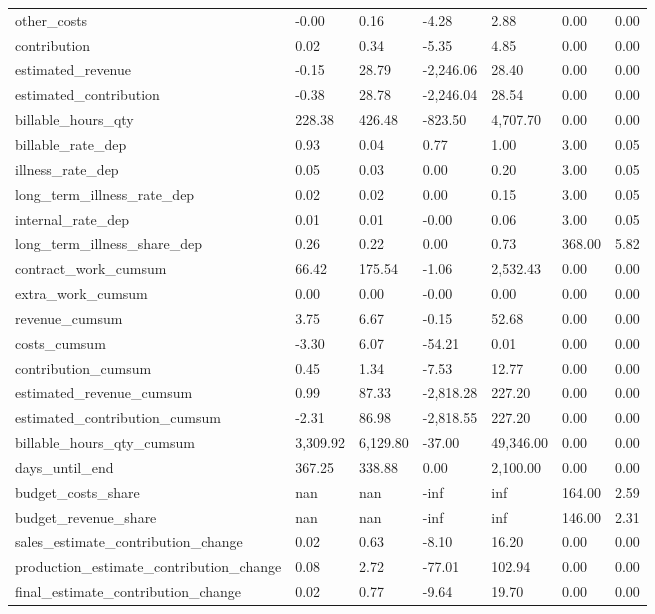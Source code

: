 \begin{landscape}
\begin{longtable}[h!]{lllllll}
other_costs & -0.00 & 0.16 & -4.28 & 2.88 & 0.00 & 0.00 \\
contribution & 0.02 & 0.34 & -5.35 & 4.85 & 0.00 & 0.00 \\
estimated_revenue & -0.15 & 28.79 & -2,246.06 & 28.40 & 0.00 & 0.00 \\
estimated_contribution & -0.38 & 28.78 & -2,246.04 & 28.54 & 0.00 & 0.00 \\
billable_hours_qty & 228.38 & 426.48 & -823.50 & 4,707.70 & 0.00 & 0.00 \\
billable_rate_dep & 0.93 & 0.04 & 0.77 & 1.00 & 3.00 & 0.05 \\
illness_rate_dep & 0.05 & 0.03 & 0.00 & 0.20 & 3.00 & 0.05 \\
long_term_illness_rate_dep & 0.02 & 0.02 & 0.00 & 0.15 & 3.00 & 0.05 \\
internal_rate_dep & 0.01 & 0.01 & -0.00 & 0.06 & 3.00 & 0.05 \\
long_term_illness_share_dep & 0.26 & 0.22 & 0.00 & 0.73 & 368.00 & 5.82 \\
contract_work_cumsum & 66.42 & 175.54 & -1.06 & 2,532.43 & 0.00 & 0.00 \\
extra_work_cumsum & 0.00 & 0.00 & -0.00 & 0.00 & 0.00 & 0.00 \\
revenue_cumsum & 3.75 & 6.67 & -0.15 & 52.68 & 0.00 & 0.00 \\
costs_cumsum & -3.30 & 6.07 & -54.21 & 0.01 & 0.00 & 0.00 \\
contribution_cumsum & 0.45 & 1.34 & -7.53 & 12.77 & 0.00 & 0.00 \\
estimated_revenue_cumsum & 0.99 & 87.33 & -2,818.28 & 227.20 & 0.00 & 0.00 \\
estimated_contribution_cumsum & -2.31 & 86.98 & -2,818.55 & 227.20 & 0.00 & 0.00 \\
billable_hours_qty_cumsum & 3,309.92 & 6,129.80 & -37.00 & 49,346.00 & 0.00 & 0.00 \\
days_until_end & 367.25 & 338.88 & 0.00 & 2,100.00 & 0.00 & 0.00 \\
budget_costs_share & nan & nan & -inf & inf & 164.00 & 2.59 \\
budget_revenue_share & nan & nan & -inf & inf & 146.00 & 2.31 \\
sales_estimate_contribution_change & 0.02 & 0.63 & -8.10 & 16.20 & 0.00 & 0.00 \\
production_estimate_contribution_change & 0.08 & 2.72 & -77.01 & 102.94 & 0.00 & 0.00 \\
final_estimate_contribution_change & 0.02 & 0.77 & -9.64 & 19.70 & 0.00 & 0.00 \\

\end{longtable}
\end{landscape}

